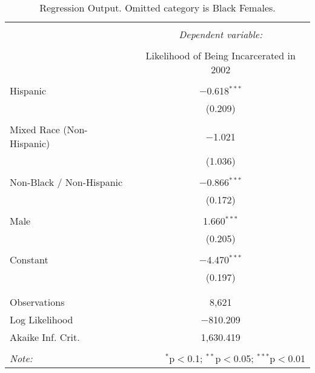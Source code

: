 
\begin{table}[!htbp] \centering 
  \caption{Regression Output. Omitted category is Black Females.} 
  \label{tab:regression} 
\begin{tabular}{@{\extracolsep{5pt}}lc} 
\\[-1.8ex]\hline 
\hline \\[-1.8ex] 
 & \multicolumn{1}{c}{\textit{Dependent variable:}} \\ 
\cline{2-2} 
\\[-1.8ex] & Likelihood of Being Incarcerated in 2002 \\ 
\hline \\[-1.8ex] 
 Hispanic & $-$0.618$^{***}$ \\ 
  & (0.209) \\ 
  & \\ 
 Mixed Race (Non-Hispanic) & $-$1.021 \\ 
  & (1.036) \\ 
  & \\ 
 Non-Black / Non-Hispanic & $-$0.866$^{***}$ \\ 
  & (0.172) \\ 
  & \\ 
 Male & 1.660$^{***}$ \\ 
  & (0.205) \\ 
  & \\ 
 Constant & $-$4.470$^{***}$ \\ 
  & (0.197) \\ 
  & \\ 
\hline \\[-1.8ex] 
Observations & 8,621 \\ 
Log Likelihood & $-$810.209 \\ 
Akaike Inf. Crit. & 1,630.419 \\ 
\hline 
\hline \\[-1.8ex] 
\textit{Note:}  & \multicolumn{1}{r}{$^{*}$p$<$0.1; $^{**}$p$<$0.05; $^{***}$p$<$0.01} \\ 
\end{tabular} 
\end{table} 
